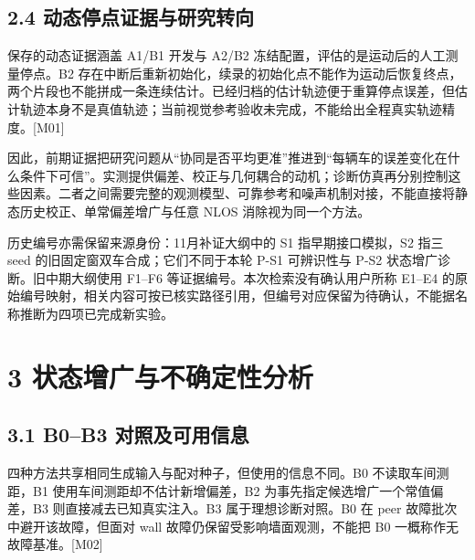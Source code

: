 \documentclass[12pt,a4paper]{article}
\begin{document}
\subsection{2.4
动态停点证据与研究转向}\label{ux52a8ux6001ux505cux70b9ux8bc1ux636eux4e0eux7814ux7a76ux8f6cux5411}

保存的动态证据涵盖 A1/B1 开发与 A2/B2
冻结配置，评估的是运动后的人工测量停点。B2
存在中断后重新初始化，续录的初始化点不能作为运动后恢复终点，两个片段也不能拼成一条连续估计。已经归档的估计轨迹便于重算停点误差，但估计轨迹本身不是真值轨迹；当前视觉参考验收未完成，不能给出全程真实轨迹精度。{[}M01{]}

因此，前期证据把研究问题从``协同是否平均更准''推进到``每辆车的误差变化在什么条件下可信''。实测提供偏差、校正与几何耦合的动机；诊断仿真再分别控制这些因素。二者之间需要完整的观测模型、可靠参考和噪声机制对接，不能直接将静态历史校正、单常偏差增广与任意
NLOS 消除视为同一个方法。

历史编号亦需保留来源身份：11月补证大纲中的 S1 指早期接口模拟，S2 指三
seed 的旧固定窗双车合成；它们不同于本轮 P-S1 可辨识性与 P-S2
状态增广诊断。旧中期大纲使用 F1--F6 等证据编号。本次检索没有确认用户所称
E1--E4
的原始编号映射，相关内容可按已核实路径引用，但编号对应保留为待确认，不能据名称推断为四项已完成新实验。

\section{3
状态增广与不确定性分析}\label{ux72b6ux6001ux589eux5e7fux4e0eux4e0dux786eux5b9aux6027ux5206ux6790}

\subsection{3.1 B0--B3
对照及可用信息}\label{b0b3-ux5bf9ux7167ux53caux53efux7528ux4fe1ux606f}

四种方法共享相同生成输入与配对种子，但使用的信息不同。B0
不读取车间测距，B1 使用车间测距却不估计新增偏差，B2
为事先指定候选增广一个常值偏差，B3 则直接减去已知真实注入。B3
属于理想诊断对照。B0 在 peer 故障批次中避开该故障，但面对 wall
故障仍保留受影响墙面观测，不能把 B0 一概称作无故障基准。{[}M02{]}
\end{document}
